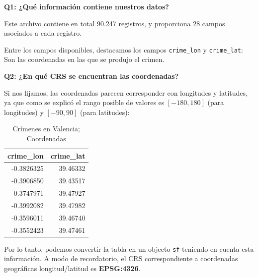 \documentclass[
]{book}
\begin{document}
\textbf{Q1: ¿Qué información contiene nuestros datos?}

Este archivo contiene en total
90.247 registros, y
proporciona 28 campos asociados a cada registro.

Entre los campos disponibles, destacamos los campos \texttt{crime\_lon} y \texttt{crime\_lat}:
Son las coordenadas en las que se produjo el crimen.

\textbf{Q2: ¿En qué CRS se encuentran las coordenadas?}

Si nos fijamos, las coordenadas parecen corresponder con longitudes y latitudes,
ya que como se explicó el rango posible de valores es \([-180, 180]\) (para
longitudes) y \([-90, 90]\) (para latitudes):

\begin{table}

\caption{\label{tab:coods-lonlat}Crímenes en Valencia; Coordenadas}
\centering
\begin{tabular}[t]{r|r}
\hline
crime\_lon & crime\_lat\\
\hline
-0.3826325 & 39.46332\\
\hline
-0.3906850 & 39.43517\\
\hline
-0.3747971 & 39.47927\\
\hline
-0.3992082 & 39.47982\\
\hline
-0.3596011 & 39.46740\\
\hline
-0.3552423 & 39.47461\\
\hline
\end{tabular}
\end{table}

Por lo tanto, podemos convertir la tabla en un objecto \texttt{sf} teniendo en cuenta
esta información. A modo de recordatorio, el CRS correspondiente a coordenadas
geográficas longitud/latitud es \textbf{EPSG:4326}.
\end{document}
